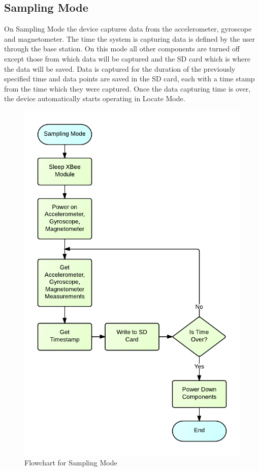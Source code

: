 \subsection{Sampling Mode}
On Sampling Mode the device captures data from the accelerometer, gyroscope and magnetometer. The time the system is capturing data is defined by the user through the base station. On this mode all other components are turned off except those from which data will be captured and the SD card which is where the data will be saved. Data is captured for the duration of the previously specified time and data points are saved in the SD card, each with a time stamp from the time which they were captured. Once the data capturing time is over, the device automatically starts operating in Locate Mode.
\begin{figure}[H]
	\centering
	\includegraphics[scale=1.0]{img/SamplingMode}
	\caption{Flowchart for Sampling Mode \label{fig:samplingMode}}
\end{figure}

